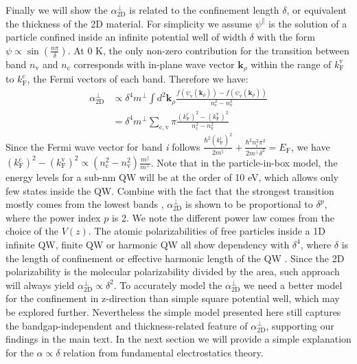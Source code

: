 \documentclass[manuscript=suppinfo,email=true,hyperref=true,keywords=false]{achemso}
\begin{document}
Finally we will show the $\alpha_{\mathrm{2D}}^{\perp}$ is related to the
confinement length $\delta$, or equivalent the thickness of the 2D
material. For simplicity we assume $\psi^{\parallel}$ is the solution
of a particle confined inside an infinite potential well of width
$\delta$ with the form $\psi \propto \sin(\frac{n\pi}{\delta})$. At 0
K, the only non-zero contribution for the transition between band
$n_{\mathrm{v}}$ and $n_{\mathrm{c}}$ corresponds with in-plane wave
vector $\mathbf{k}_{\rho}$ within the range of $k_{\mathrm{F}}^{\mathrm{v}}$ to
$k_{\mathrm{F}}^{\mathrm{c}}$, the Fermi vectors of each band. Therefore we have:
\begin{equation}
  \begin{aligned}
    \alpha_{\mathrm{2D}}^{\perp} &\propto \delta^{4} m^{\perp} \int
    d^{2}\mathbf{k}_{\rho}
    \frac{f(\psi_{\mathrm{v}}(\mathbf{k}_{\rho}))
      -f(\psi_{\mathrm{v}}(\mathbf{k}_{\rho})) }{n_{\mathrm{c}}^{2} -
      n_{\mathrm{v}}^{2}}\\
    &= \delta^{4} m^{\perp} \sum_{\mathrm{c, v}}\pi \frac{
      (k_{\mathrm{F}}^{\mathrm{c}})^{2} -
        (k_{\mathrm{F}}^{\mathrm{v}})^{2}}{n_{\mathrm{c}}^{2} -
        n_{\mathrm{v}}^{2}}
  \end{aligned}
\end{equation}
Since the Fermi wave vector for band \textit{i} follows
${\displaystyle
  \frac{\hbar^{2}(k_{\mathrm{F}}^{i})^{2}}{2m^{\parallel}}} +
{\displaystyle \frac{\hbar^{2} n_{i}^{2} \pi^{2}}{2m^{\perp}
    \delta^{2}}} = E_{\mathrm{F}}$, we have
$ (k_{\mathrm{F}}^{\mathrm{c}})^{2} -
(k_{\mathrm{F}}^{\mathrm{v}})^{2} \propto (n_{\mathrm{c}}^{2} -
n_{\mathrm{v}}^{2}) {\displaystyle
  \frac{m^{\parallel}}{m^{\perp}}}$. Note that in the particle-in-box
model, the energy levels for a sub-nm QW will be at the order of 10
eV, which allows only few states inside the QW. Combine with the fact
that the strongest transition mostly comes from the lowest bands
\cite{davies_physics_1997}, $\alpha^{\perp}_{\mathrm{2D}}$ is shown to
be proportional to $\delta^{p}$, where the power index $p$ is 2. We
note the different power law comes from the choice of the $V(z)$. The
atomic polarizabilities of free particles inside a 1D infinite QW,
finite QW or harmonic QW all show dependency with $\delta^{4}$, where
$\delta$ is the length of confinement or effective harmonic length of
the QW \cite{Fowler_1984,Maize_2011}. Since the 2D polarizability is
the molecular polarizability divided by the area, such approach will
always yield $\alpha_{\mathrm{2D}}^{\perp} \propto \delta^{2}$. To
accurately model the $\alpha_{\mathrm{2D}}^{\perp}$ we need a better
model for the confinement in z-direction than simple square potential
well, which may be explored further. Nevertheless the simple model presented
here still captures the bandgap-independent and thickness-related feature
of $\alpha_{\mathrm{2D}}^{\perp}$, supporting our findings in the main
text. In the next section we will provide a simple explanation for the $\alpha \propto \delta$ relation from fundamental electrostatics theory.
\end{document}
